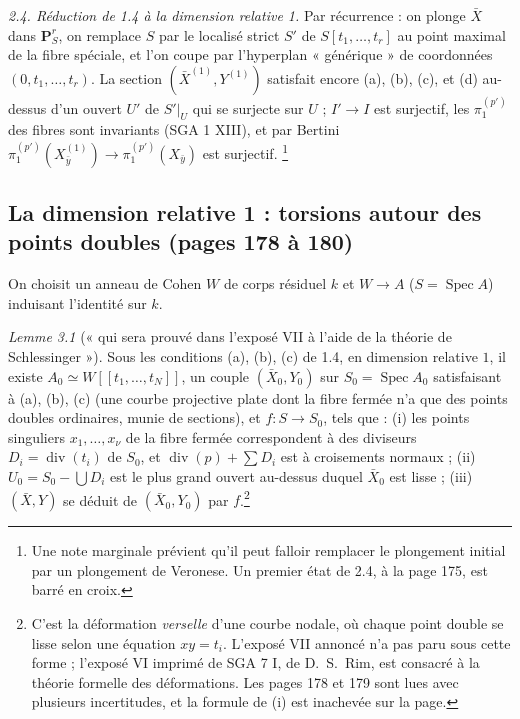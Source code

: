 \documentclass[11pt,a4paper]{article}
\begin{document}

\emph{2.4. Réduction de 1.4 à la dimension relative 1.} Par récurrence : on plonge
$\bar X$ dans $\mathbf{P}^r_S$, on remplace $S$ par le localisé strict $S'$ de
$S[t_1, \ldots, t_r]$ au point maximal de la fibre spéciale, et l'on coupe par
l'hyperplan « générique » de coordonnées $(0, t_1, \ldots, t_r)$. La section
$(\bar X^{(1)}, Y^{(1)})$ satisfait encore (a), (b), (c), et (d) au-dessus d'un
ouvert $U'$ de $S'|_U$ qui se surjecte sur $U$ ; $I' \to I$ est surjectif, les
$\pi_1^{(p')}$ des fibres sont invariants (SGA 1 XIII), et par Bertini
$\pi_1^{(p')}(X^{(1)}_{\bar y}) \to \pi_1^{(p')}(X_{\bar y})$ est surjectif.
\footnote{Une note marginale prévient qu'il peut falloir remplacer le plongement
initial par un plongement de Veronese. Un premier état de 2.4, à la page 175, est
barré en croix.}

\subsection*{La dimension relative 1 : torsions autour des points doubles (pages 178 à 180)}

On choisit un anneau de Cohen $W$ de corps résiduel $k$ et $W \to A$
($S = \operatorname{Spec} A$) induisant l'identité sur $k$.

\emph{Lemme 3.1} (« qui sera prouvé dans l'exposé VII à l'aide de la théorie de
Schlessinger »). Sous les conditions (a), (b), (c) de 1.4, en dimension relative
$1$, il existe $A_0 \simeq W[[t_1, \ldots, t_N]]$, un couple $(\bar X_0, Y_0)$ sur
$S_0 = \operatorname{Spec} A_0$ satisfaisant à (a), (b), (c) (une courbe
projective plate dont la fibre fermée n'a que des points doubles ordinaires,
munie de sections), et $f : S \to S_0$, tels que : (i) les points singuliers
$x_1, \ldots, x_\nu$ de la fibre fermée correspondent à des diviseurs
$D_i = \operatorname{div}(t_i)$ de $S_0$, et $\operatorname{div}(p) + \sum D_i$ est
à croisements normaux ; (ii) $U_0 = S_0 - \bigcup D_i$ est le plus grand ouvert
au-dessus duquel $\bar X_0$ est lisse ; (iii) $(\bar X, Y)$ se déduit de
$(\bar X_0, Y_0)$ par $f$.\footnote{C'est la déformation \emph{verselle} d'une
courbe nodale, où chaque point double se lisse selon une équation $xy = t_i$.
L'exposé VII annoncé n'a pas paru sous cette forme ; l'exposé VI imprimé de SGA 7
I, de D.\ S.\ Rim, est consacré à la théorie formelle des déformations. Les
pages 178 et 179 sont lues avec plusieurs incertitudes, et la formule de (i) est
inachevée sur la page.}
\end{document}
